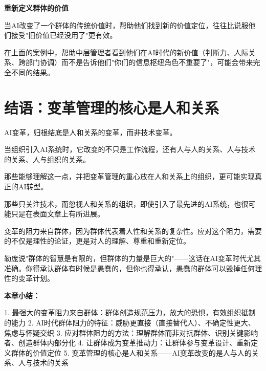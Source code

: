 \textbf{重新定义群体的价值}

当AI改变了一个群体的传统价值时，帮助他们找到新的价值定位，往往比说服他们接受"旧价值已经没用了"更有效。

在上面的案例中，帮助中层管理者看到他们在AI时代的新价值（判断力、人际关系、跨部门协调）而不是告诉他们"你们的信息枢纽角色不重要了"，可能会带来完全不同的结果。

\section{结语：变革管理的核心是人和关系}


AI变革，归根结底是人和关系的变革，而非技术变革。

当组织引入AI系统时，它改变的不只是工作流程，还有人与人的关系、人与技术的关系、人与组织的关系。

那些能够理解这一点，并把变革管理的重心放在人和关系上的组织，更可能实现真正的AI转型。

那些只关注技术，而忽视人和关系的组织，即使引入了最先进的AI系统，也很可能只是在表面文章上有所进展。

变革的阻力来自群体，因为群体代表着人性和关系的复杂性。应对这个阻力，需要的不仅是理性的论证，更是对人的理解、尊重和重新定位。

勒庞说"群体的智慧是有限的，但群体的力量是巨大的"——这话在AI变革时代尤其准确。你得承认群体有时候是愚蠢的，但你也得承认，愚蠢的群体可以毁掉任何理性的变革计划。


\textbf{本章小结：}

1. 最强大的变革阻力来自群体：群体创造规范压力，放大的恐惧，有效组织抵制的能力
2. AI时代群体阻力的特征：威胁更直接（直接替代人）、不确定性更大、焦虑与怀疑交织
3. 应对群体阻力的方法：理解群体而非对抗群体、识别关键影响者、创造群体内部分化
4. 让群体成为变革推动力：让群体参与变革设计、重新定义群体的价值定位
5. 变革管理的核心是人和关系——AI变革改变的是人与人的关系、人与技术的关系
